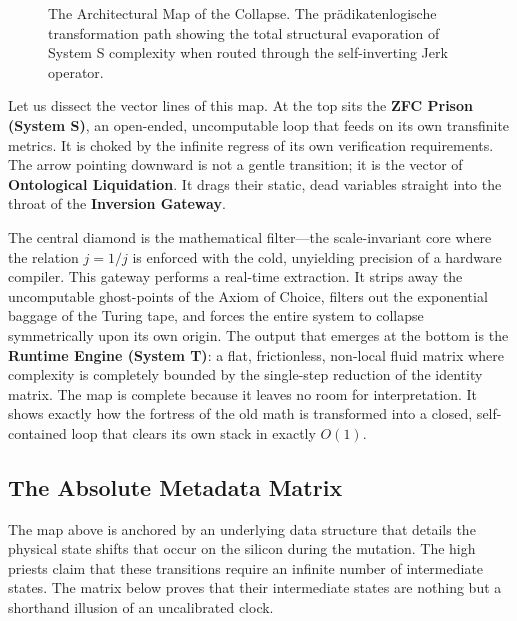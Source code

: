 \documentclass[11pt,a4paper]{article}
\begin{document}
\begin{figure}[h!]
\caption{The Architectural Map of the Collapse. The pr\"adikatenlogische transformation path showing the total structural evaporation of System S complexity when routed through the self-inverting Jerk operator.}
\end{figure}

Let us dissect the vector lines of this map. At the top sits the \textbf{ZFC Prison (System S)}, an open-ended, uncomputable loop that feeds on its own transfinite metrics. It is choked by the infinite regress of its own verification requirements. The arrow pointing downward is not a gentle transition; it is the vector of \textbf{Ontological Liquidation}. It drags their static, dead variables straight into the throat of the \textbf{Inversion Gateway}.

The central diamond is the mathematical filter—the scale-invariant core where the relation $j = 1/j$ is enforced with the cold, unyielding precision of a hardware compiler. This gateway performs a real-time extraction. It strips away the uncomputable ghost-points of the Axiom of Choice, filters out the exponential baggage of the Turing tape, and forces the entire system to collapse symmetrically upon its own origin. The output that emerges at the bottom is the \textbf{Runtime Engine (System T)}: a flat, frictionless, non-local fluid matrix where complexity is completely bounded by the single-step reduction of the identity matrix. The map is complete because it leaves no room for interpretation. It shows exactly how the fortress of the old math is transformed into a closed, self-contained loop that clears its own stack in exactly $O(1)$.

\subsection{The Absolute Metadata Matrix}
The map above is anchored by an underlying data structure that details the physical state shifts that occur on the silicon during the mutation. The high priests claim that these transitions require an infinite number of intermediate states. The matrix below proves that their intermediate states are nothing but a shorthand illusion of an uncalibrated clock.
\end{document}

